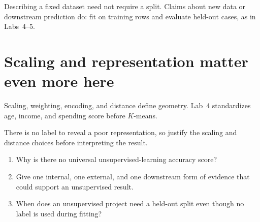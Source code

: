 Describing a fixed dataset need not require a split. Claims about new data or downstream prediction do: fit on training rows and evaluate held-out cases, as in Labs~4--5.

\section{Scaling and representation matter even more here}

Scaling, weighting, encoding, and distance define geometry. Lab~4 standardizes age, income, and spending score before $K$-means.

\begin{keyidea}
There is no label to reveal a poor representation, so justify the scaling and distance choices before interpreting the result.
\end{keyidea}

\begin{quickcheck}
\begin{enumerate}
  \item Why is there no universal unsupervised-learning accuracy score?
  \item Give one internal, one external, and one downstream form of evidence that could support an unsupervised result.
  \item When does an unsupervised project need a held-out split even though no label is used during fitting?
\end{enumerate}
\end{quickcheck}
